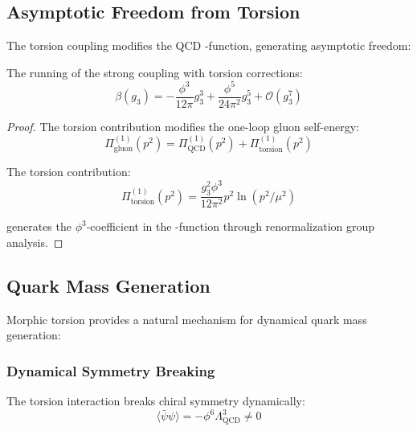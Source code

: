 \subsection{Asymptotic Freedom from Torsion}

The torsion coupling modifies the QCD \beta-function, generating asymptotic freedom:

\begin{theorem}
The running of the strong coupling with torsion corrections:
\begin{equation}
\beta(g_3) = -\frac{\phi^3}{12\pi} g_3^3 + \frac{\phi^5}{24\pi^2} g_3^5 + \mathcal{O}(g_3^7)
\label{eq:torsion_beta_function}
\end{equation}
\end{theorem}

\begin{proof}
The torsion contribution modifies the one-loop gluon self-energy:
\begin{equation}
\Pi_{\text{gluon}}^{(1)}(p^2) = \Pi_{\text{QCD}}^{(1)}(p^2) + \Pi_{\text{torsion}}^{(1)}(p^2)
\end{equation}

The torsion contribution:
\begin{equation}
\Pi_{\text{torsion}}^{(1)}(p^2) = \frac{g_3^2 \phi^3}{12\pi^2} p^2 \ln(p^2/\mu^2)
\end{equation}

generates the $\phi^3$-coefficient in the \beta-function through renormalization group analysis.
\end{proof}

\subsection{Quark Mass Generation}

Morphic torsion provides a natural mechanism for dynamical quark mass generation:

\subsubsection{Dynamical Symmetry Breaking}

\begin{theorem}
The torsion interaction breaks chiral symmetry dynamically:
\begin{equation}
\langle \bar{\psi}\psi \rangle = -\phi^6 \Lambda_{\text{QCD}}^3 \neq 0
\label{eq:torsion_chiral_condensate}
\end{equation}
\end{theorem}

